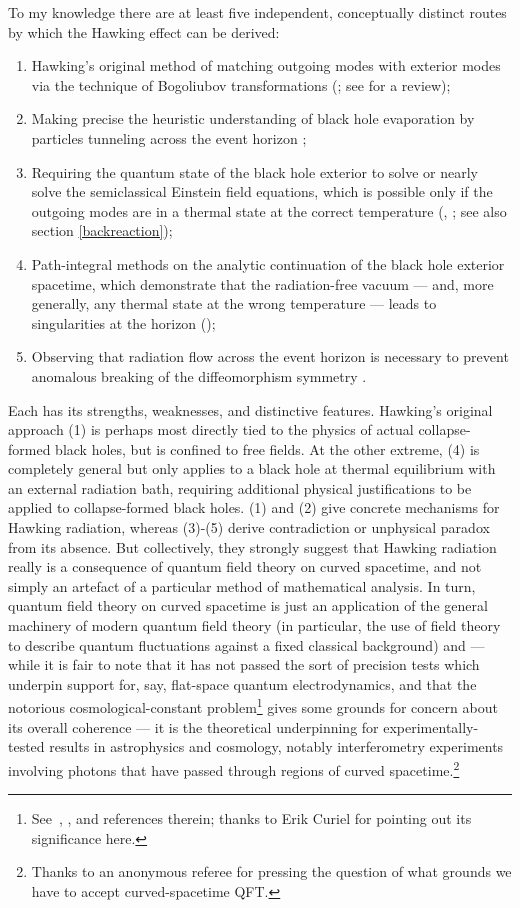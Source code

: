 \documentclass[12pt]{article}
\begin{document}
 To my knowledge there are at least five independent, conceptually distinct routes by which the Hawking effect can be derived:
 \begin{enumerate}
 \item Hawking's original method of matching outgoing modes with exterior modes via the technique of Bogoliubov transformations (; see  for a review);
 \item Making precise the heuristic understanding of black hole evaporation by particles tunneling across the event horizon \cite{parikhwilczek};
 \item Requiring the quantum state of the black hole exterior to solve or nearly solve the semiclassical Einstein field equations, which is possible only if the outgoing modes are in a thermal state at the correct temperature (, ; see also section \ref{backreaction});
 \item Path-integral methods on the analytic continuation of the black hole exterior spacetime, which demonstrate that the radiation-free vacuum --- and, more generally, any thermal state at the wrong temperature --- leads to singularities at the horizon ();
 \item Observing that radiation flow across the event horizon is necessary to prevent anomalous breaking of the diffeomorphism symmetry \cite{robinsonwilczek}. 
 \end{enumerate}
 Each has its strengths, weaknesses, and distinctive features. Hawking's original approach (1) is perhaps most directly tied to the physics of actual collapse-formed black holes, but is confined to free fields. At the other extreme, (4) is completely general but only applies to a black hole at thermal equilibrium with an external radiation bath, requiring additional physical justifications to be applied to collapse-formed black holes. (1) and (2) give concrete mechanisms for Hawking radiation, whereas (3)-(5) derive contradiction or unphysical paradox from its absence. But collectively, they strongly suggest that Hawking radiation really is a consequence of quantum field theory on curved spacetime, and not simply an artefact of a particular method of mathematical analysis. In turn, quantum field theory on curved spacetime is just an application of the general machinery of modern quantum field theory (in particular, the use of field theory to describe quantum fluctuations against a fixed classical background) and --- while it is fair to note that it has not passed the sort of precision tests which underpin support for, say, flat-space quantum electrodynamics, and that the notorious cosmological-constant problem\footnote{See~, , and references therein; thanks to Erik Curiel for pointing out its significance here.} gives some grounds for concern about its overall coherence --- it is the theoretical underpinning for experimentally-tested results in astrophysics and cosmology, notably interferometry experiments involving photons that have passed through regions of curved spacetime.\footnote{Thanks to an anonymous referee for pressing the question of what grounds we have to accept curved-spacetime QFT.}
 
\end{document}
